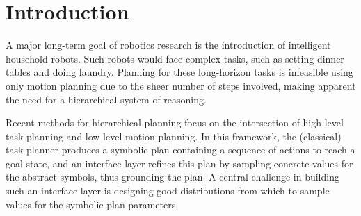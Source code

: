 \section{Introduction}
A major long-term goal of robotics research is the introduction of intelligent household robots.
Such robots would face complex tasks, such as setting
dinner tables and doing laundry. Planning for these long-horizon tasks is infeasible
using only motion planning due to the sheer number of steps involved, making apparent the need
for a hierarchical system of reasoning.

Recent methods for hierarchical planning focus on the intersection of high level task planning
and low level motion planning. In this framework, the (classical) task planner produces
a symbolic plan containing a sequence of actions to reach a goal
state, and an interface layer refines this plan by sampling concrete values for
the abstract symbols, thus grounding the plan. A central challenge in building such
an interface layer is designing good distributions from which to sample
values for the symbolic plan parameters.

